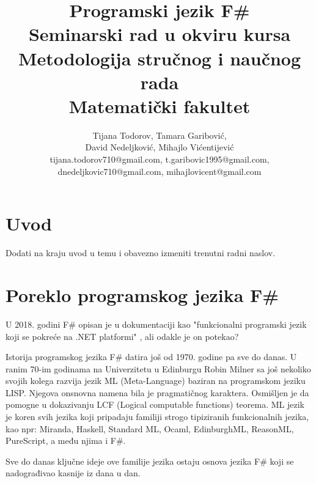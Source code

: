 \documentclass[a4paper]{article}
\begin{document}
\title{Programski jezik F\#\\ \small{Seminarski rad u okviru kursa\\Metodologija stručnog i naučnog rada\\ Matematički fakultet}}

\author{Tijana Todorov, Tamara Garibović,\\ David Nedeljković, Mihajlo Vićentijević \\ tijana.todorov710@gmail.com, t.garibovic1995@gmail.com, \\ dnedeljkovic710@gmail.com, mihajlovicent@gmail.com}


\maketitle


\tableofcontents

\newpage

\section{Uvod}
\label{sec:uvod}

Dodati na kraju uvod u temu i obavezno izmeniti trenutni radni naslov.

\section{Poreklo programskog jezika F\#}
\label{sec:poreklo}

U 2018. godini F\# opisan je u dokumentaciji kao "funkcionalni programski jezik koji se pokreće na .NET platformi" \cite{early_history}, ali odakle je on potekao?

Istorija programskog jezika F\# datira još od 1970. godine pa sve do danas. U ranim 70-im godinama na Univerzitetu u Edinburgu Robin Milner sa još nekoliko svojih kolega razvija jezik ML (Meta-Language) baziran na programskom jeziku LISP. Njegova onsnovna namena bila je pragmatičnog karaktera. Osmišljen je da pomogne u dokazivanju LCF (Logical computable functions) \cite{Milner:1972:LCF:891954} teorema. ML jezik je koren svih jezika koji pripadaju familiji strogo tipiziranih funkcionalnih jezika, kao npr: Miranda, Haskell, Standard ML, Ocaml, EdinburghML, ReasonML, PureScript, a među njima i F\#.

Sve do danas ključne ideje ove familije jezika ostaju osnova jezika F\# koji se nadograđivao kasnije iz dana u dan. 
\end{document}
